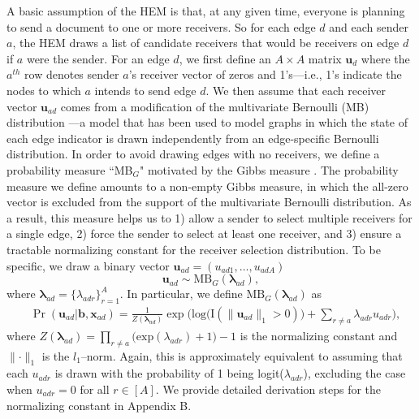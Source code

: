 \documentclass[ba]{imsart}
\numberwithin{equation}{section}
\theoremstyle{plain}
\begin{document}
A basic assumption of the HEM is that, at any given time, everyone is planning to send a document to one or more receivers. So for each edge $d$ and each sender $a$, the HEM draws a list of candidate receivers that would be receivers on edge $d$ if $a$ were the sender. For an edge $d$, we first define an $A\times A$ matrix $\boldsymbol{u}_d$ where the $a^{th}$ row denotes sender $a$'s receiver vector of zeros and 1's---i.e., 1's indicate the nodes to which $a$ intends to send edge $d$. We then assume that each receiver vector $\boldsymbol{u}_{ad}$ comes from a modification of the multivariate Bernoulli (MB) distribution \citep{dai2013multivariate}---a model that has been used to model graphs in which the state of each edge indicator is drawn independently from an edge-specific Bernoulli distribution. In order to avoid drawing edges with no receivers, we define a probability measure ``MB$_{G}$" motivated by the Gibbs measure \citep{fellows2017removing}. The probability measure we define amounts to a non-empty Gibbs measure, in which the all-zero vector is excluded from the support of the multivariate Bernoulli distribution. As a result, this measure helps us to 1) allow a sender to select multiple receivers for a single edge, 2) force the sender to select at least one receiver, and 3) ensure a tractable normalizing constant for the receiver selection distribution. To be specific, we draw a binary vector $\boldsymbol{u}_{ad}= (u_{ad1},
\ldots, u_{adA})$ 
\begin{equation} \boldsymbol{u}_{ad}  \sim
\mbox{MB}_{G}(\boldsymbol{\lambda}_{ad}),
\end{equation}
where $\boldsymbol{\lambda}_{ad}= \{\lambda_{adr}\}_{r=1}^A$. In particular, we define $\mbox{MB}_{G}(\boldsymbol{\lambda}_{ad})$ as
\begin{equation}
\begin{aligned}
&\Pr(\boldsymbol{u}_{ad}|\boldsymbol{b}, \boldsymbol{x}_{ad}) = \frac{1}{Z(\boldsymbol{\lambda}_{ad})}\exp\Big(\mbox{log}\big(\text{I}( \lVert \boldsymbol{u}_{ad}\rVert_1 > 0 )\big) + \sum_{r\neq a} \lambda_{adr}u_{adr}\Big) ,
\end{aligned}
\label{eqn:Gibbs}
\end{equation}
where $Z(\boldsymbol{\lambda}_{ad})= \prod_{r \neq a} \big(\mbox{exp}(\lambda_{adr}) + 1\big)-1$ is the normalizing constant and $\lVert \cdot \rVert_1$ is the $l_1$--norm. Again, this is approximately equivalent to assuming that each $u_{adr}$ is drawn with the probability of 1 being logit($\lambda_{adr}$), excluding the case when $u_{adr}=0$ for all $r \in [A]$. We provide detailed derivation steps for the normalizing constant in Appendix B. 
\end{document}
